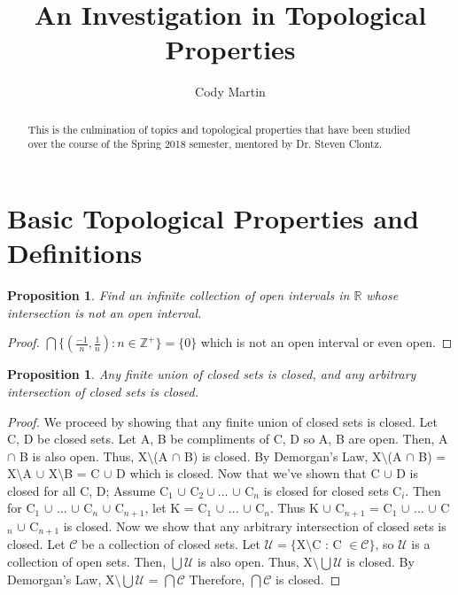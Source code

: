 \documentclass{amsart}
\theoremstyle{plain}
\newtheorem{proposition}[theorem]{Proposition}
\theoremstyle{definition}
\theoremstyle{remark}
\begin{document}
\title{An Investigation in Topological Properties}


\author{Cody Martin}
\address{1313 Schillinger Rd. S. 
Apt. 3407
Mobile, AL 36695}









\begin{abstract}
  This is the culmination of topics and topological properties that have been studied over the course of the Spring 2018 semester, mentored by Dr. Steven Clontz.
\end{abstract}


\maketitle

\section{Basic Topological Properties and Definitions}

	\begin{proposition}
	Find an infinite collection of open intervals in $\mathbb{R}$ whose intersection is not an open interval.
	\end{proposition}
	\begin{proof}
	$\bigcap\lbrace (\frac{-1}{n}, \frac{1}{n}) : n \in \mathbb{Z}^+\rbrace = \lbrace 0 \rbrace$ which is not an open interval or even open.
	\end{proof}

  \begin{proposition}
      Any finite union of closed sets is closed, and any arbitrary intersection of closed sets is closed.
  \end{proposition}
  \begin{proof}
	We proceed by showing that any finite union of closed sets is closed. Let C, D be closed sets. Let A, B be compliments of C, D so A, B are open. Then, A $\cap$ B is also open. Thus, X$\setminus$(A $\cap$ B) is closed. By Demorgan's Law, X$\setminus$(A $\cap$ B) = X$\setminus$A $\cup$ X$\setminus$B = C $\cup$ D which is closed.
	\newline\newline Now that we've shown that C $\cup$ D is closed for all C, D; Assume C$_1$ $\cup $ C$_2 \cup ...$ $\cup $ C$_n$ is closed for closed sets C$_i$. Then for C$_1$ $\cup$ ... $\cup$ C$_n$ $\cup$ C$_{n+1}$, let K = C$_1$ $\cup$ ... $\cup$ C$_n$. Thus K $\cup$ C$_{n+1}$ = C$_1$ $\cup$ ... $\cup$ C$_n$ $\cup$ C$_{n+1}$ is closed.
	\newline\newline Now we show that any arbitrary intersection of closed sets is closed. Let $\mathcal{C}$ be a collection of closed sets. Let $\mathcal{U} = \lbrace$X$\setminus$C : C $\in \mathcal{C}\rbrace$, so $\mathcal{U}$ is a collection of open sets. Then, $\bigcup \mathcal{U}$ is also open. Thus, X$\setminus\bigcup\mathcal{U}$ is closed. By Demorgan's Law, X$\setminus\bigcup\mathcal{U}$ = $\bigcap\mathcal{C}$ Therefore, $\bigcap\mathcal{C}$ is closed.
	\end{proof}
\end{document}
